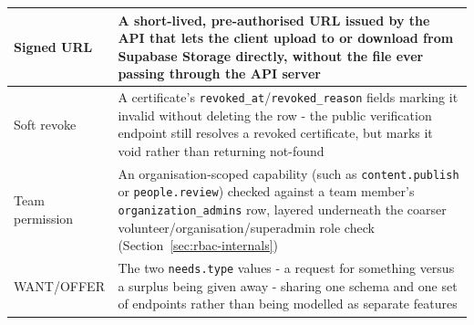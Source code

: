 \begin{longtable}{|p{}|>{\raggedright\arraybackslash}p{}|}
Signed URL & A short-lived, pre-authorised URL issued by the API that lets the client upload to or download from Supabase Storage directly, without the file ever passing through the API server\\\hline
Soft revoke & A certificate's \texttt{revoked\_at}/\texttt{revoked\_reason} fields marking it invalid without deleting the row - the public verification endpoint still resolves a revoked certificate, but marks it void rather than returning not-found\\\hline
Team permission & An organisation-scoped capability (such as \texttt{content.publish} or \texttt{people.review}) checked against a team member's \texttt{organization\_admins} row, layered underneath the coarser volunteer/organisation/superadmin role check (Section~\ref{sec:rbac-internals})\\\hline
WANT/OFFER & The two \texttt{needs.type} values - a request for something versus a surplus being given away - sharing one schema and one set of endpoints rather than being modelled as separate features\\\hline
\end{longtable}

